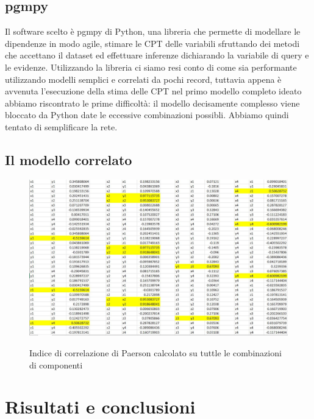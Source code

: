 \documentclass[12pt]{article}
\begin{document}
\subsection{pgmpy}
Il software scelto è pgmpy\cite{pgmpy} di Python, una libreria che permette di modellare le dipendenze in modo agile, stimare le CPT delle variabili sfruttando dei metodi che accettano il dataset ed effettuare inferenze dichiarando la variabile di query e le evidenze. \linebreak
Utilizzando la libreria ci siamo resi conto di come sia performante utilizzando modelli semplici e correlati da pochi record, tuttavia appena è avvenuta l'esecuzione della stima delle CPT nel primo modello completo ideato abbiamo riscontrato le prime difficoltà: il modello decisamente complesso viene bloccato da Python date le eccessive combinazioni possibli. Abbiamo quindi tentato di semplificare la rete.

\subsection{Il modello correlato}
\begin{figure}[H]
	\centering
	{\includegraphics[width=1\textwidth]{images/corr05.JPG}}
	\caption{Indice di correlazione di Paerson calcolato su tuttle le combinazioni di componenti}
	\label{fig:corr}
\end{figure}



\clearpage
\section{Risultati e conclusioni}

\newpage


\end{document}
